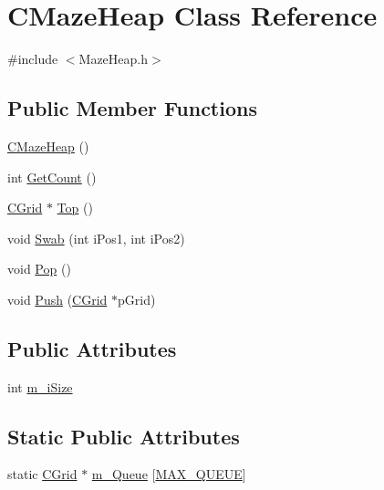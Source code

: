 \hypertarget{classCMazeHeap}{}\section{C\+Maze\+Heap Class Reference}
\label{classCMazeHeap}


{\ttfamily \#include $<$Maze\+Heap.\+h$>$}

\subsection*{Public Member Functions}
\begin{DoxyCompactItemize}
\item 
\mbox{\hyperlink{classCMazeHeap_a05d1e0c967a6da8013462cc31e1c7f29}{C\+Maze\+Heap}} ()
\item 
int \mbox{\hyperlink{classCMazeHeap_a4c22a9b5b187dab652852865759e4ac8}{Get\+Count}} ()
\item 
\mbox{\hyperlink{classCGrid}{C\+Grid}} $\ast$ \mbox{\hyperlink{classCMazeHeap_a693bcc7a6b75ca4fc2cfa857470373d9}{Top}} ()
\item 
void \mbox{\hyperlink{classCMazeHeap_a524f4b1636abc1f6c226bfda58d7f5ae}{Swab}} (int i\+Pos1, int i\+Pos2)
\item 
void \mbox{\hyperlink{classCMazeHeap_aed07b26593ef69be25b800cc06ddfaff}{Pop}} ()
\item 
void \mbox{\hyperlink{classCMazeHeap_a09d7a4322221d93c8b342bcfcae98dcd}{Push}} (\mbox{\hyperlink{classCGrid}{C\+Grid}} $\ast$p\+Grid)
\end{DoxyCompactItemize}
\subsection*{Public Attributes}
\begin{DoxyCompactItemize}
\item 
int \mbox{\hyperlink{classCMazeHeap_a9f1d48ec930288cfa74a5774db9a4d6f}{m\+\_\+i\+Size}}
\end{DoxyCompactItemize}
\subsection*{Static Public Attributes}
\begin{DoxyCompactItemize}
\item 
static \mbox{\hyperlink{classCGrid}{C\+Grid}} $\ast$ \mbox{\hyperlink{classCMazeHeap_a40d9fd82776322cab3be140b8ff15bba}{m\+\_\+\+Queue}} \mbox{[}\mbox{\hyperlink{MazeHeap_8h_ab94814559b67e4a2a564087f821145ea}{M\+A\+X\+\_\+\+Q\+U\+E\+UE}}\mbox{]}
\end{DoxyCompactItemize}


